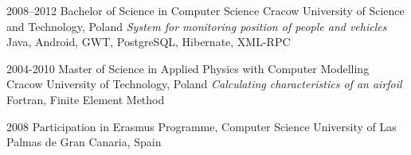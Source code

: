 \documentclass[]{gaza-cv} %
\begin{document}
\begin{entrylist}

\entry
{2008--2012}
{Bachelor of Science {\normalfont in Computer Science}}
{Cracow University of Science and Technology, Poland}
{\emph{System for monitoring position of people and vehicles} \\Java, Android, GWT, PostgreSQL, Hibernate, XML-RPC}


\entry
{2004-2010}
{Master of Science {\normalfont in Applied Physics with Computer Modelling}}
{Cracow University of Technology, Poland}
{\emph{Calculating characteristics of an airfoil} \\Fortran, Finite Element Method}



\entry
{2008}
{Participation in Erasmus Programme, {\normalfont Computer Science}}
{University of Las Palmas de Gran Canaria, Spain}
{}

\end{entrylist}
\end{document}
